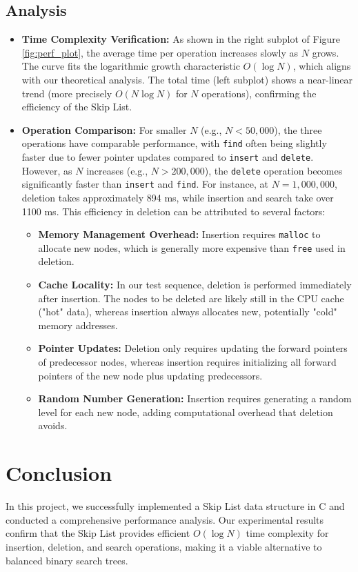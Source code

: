 \documentclass[a4paper,12pt]{article}
\begin{document}
\subsection{Analysis}
\begin{itemize}
    \item \textbf{Time Complexity Verification:} 
    As shown in the right subplot of Figure \ref{fig:perf_plot}, the average time per operation increases slowly as $N$ grows. The curve fits the logarithmic growth characteristic $O(\log N)$, which aligns with our theoretical analysis. The total time (left subplot) shows a near-linear trend (more precisely $O(N \log N)$ for $N$ operations), confirming the efficiency of the Skip List.
    
    \item \textbf{Operation Comparison:} 
    For smaller $N$ (e.g., $N < 50,000$), the three operations have comparable performance, with \texttt{find} often being slightly faster due to fewer pointer updates compared to \texttt{insert} and \texttt{delete}.
    However, as $N$ increases (e.g., $N > 200,000$), the \texttt{delete} operation becomes significantly faster than \texttt{insert} and \texttt{find}. For instance, at $N=1,000,000$, deletion takes approximately 894 ms, while insertion and search take over 1100 ms. This efficiency in deletion can be attributed to several factors:
    \begin{itemize}
        \item \textbf{Memory Management Overhead:} Insertion requires \texttt{malloc} to allocate new nodes, which is generally more expensive than \texttt{free} used in deletion.
        \item \textbf{Cache Locality:} In our test sequence, deletion is performed immediately after insertion. The nodes to be deleted are likely still in the CPU cache ("hot" data), whereas insertion always allocates new, potentially "cold" memory addresses.
        \item \textbf{Pointer Updates:} Deletion only requires updating the forward pointers of predecessor nodes, whereas insertion requires initializing all forward pointers of the new node plus updating predecessors.
        \item \textbf{Random Number Generation:} Insertion requires generating a random level for each new node, adding computational overhead that deletion avoids.
    \end{itemize}
\end{itemize}

\section{Conclusion}
In this project, we successfully implemented a Skip List data structure in C and conducted a comprehensive performance analysis. Our experimental results confirm that the Skip List provides efficient $O(\log N)$ time complexity for insertion, deletion, and search operations, making it a viable alternative to balanced binary search trees.
\end{document}
